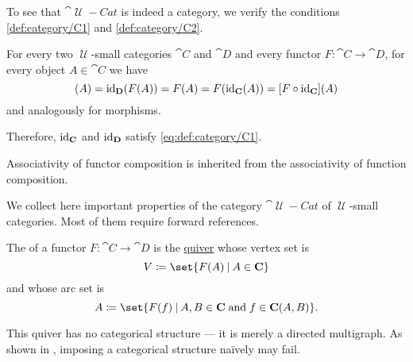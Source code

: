 \begin{defproof}
  To see that \( \cat{\mscrU-Cat} \) is indeed a category, we verify the conditions \ref{def:category/C1} and \ref{def:category/C2}.

   For every two \( \mscrU \)-small categories \( \cat{C} \) and \( \cat{D} \) and every functor \( F: \cat{C} \to \cat{D} \), for every object \( A \in \cat{C} \) we have
  \begin{equation*}
    [\id_{\cat{D}} \bincirc F](A)
    =
    \id_{\cat{D}}(F(A))
    =
    F(A)
    =
    F(\id_{\cat{C}}(A))
    =
    [F \bincirc \id_{\cat{C}}](A)
  \end{equation*}
  and analogously for morphisms.

  Therefore, \( \operatorname{id}_{\operatorname{\mathbf{C}}} \) and \( \operatorname{id}_{\operatorname{\mathbf{D}}} \) satisfy \eqref{eq:def:category/C1}.

   Associativity of functor composition is inherited from the associativity of function composition.
\end{defproof}

\begin{proposition}\label{thm:category_of_small_categories_properites}
  We collect here important properties of the category \hyperref[def:category_of_small_categories]{\( \cat{\mscrU-Cat} \)} of \( \mscrU \)-small categories. Most of them require forward references.
\end{proposition}

\begin{definition}\label{def:functor_image}
  The  of a functor \( F: \cat{C} \to \cat{D} \) is the \hyperref[def:quiver]{quiver} whose vertex set is
  \begin{equation*}
    V \coloneqq \set{ F(A) \given A \in \cat{C} }
  \end{equation*}
  and whose arc set is
  \begin{equation*}
    A \coloneqq \set{ F(f) \given A, B \in \cat{C} \T{and} f \in \cat{C}(A, B) }.
  \end{equation*}

  This quiver has no categorical structure --- it is merely a directed multigraph. As shown in , imposing a categorical structure na\"ively may fail.
\end{definition}

